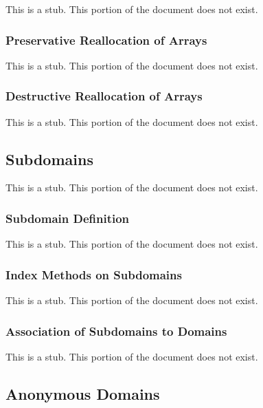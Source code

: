 This is a stub.  This portion of the document does not exist.

\subsubsection{Preservative Reallocation of Arrays}
\label{Preservative_Reallocation_of_Arrays}

This is a stub.  This portion of the document does not exist.

\subsubsection{Destructive Reallocation of Arrays}
\label{Destructive_Reallocation_of_Arrays}

This is a stub.  This portion of the document does not exist.

\subsection{Subdomains}
\label{Subdomains}

This is a stub.  This portion of the document does not exist.

\subsubsection{Subdomain Definition}
\label{Subdomain_Definition}

This is a stub.  This portion of the document does not exist.

\subsubsection{Index Methods on Subdomains}
\label{Index_Methods_on_Subdomains}

This is a stub.  This portion of the document does not exist.

\subsubsection{Association of Subdomains to Domains}
\label{Association_of_Subdomains_to_Domains}

This is a stub.  This portion of the document does not exist.

\subsection{Anonymous Domains}
\label{Anonymous_Domains}

